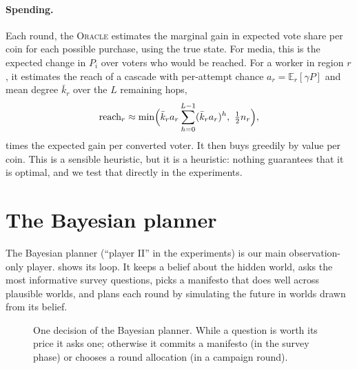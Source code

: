 \documentclass[11pt,a4paper,oneside]{report}
\newcommand{\E}{\mathbb{E}}
\newcommand{\ORACLE}{\textsc{Oracle}}
\begin{document}
\paragraph{Spending.} Each round, the \ORACLE{} estimates the marginal gain in expected vote share per coin
for each possible purchase, using the true state. For media, this is the expected change in $P_i$ over
voters who would be reached. For a worker in region $r$, it estimates the reach of a cascade with
per-attempt chance $a_r = \E_r[\gamma P]$ and mean degree $\bar k_r$ over the $L$ remaining hops,
\begin{equation}
  \text{reach}_r \approx \min\Bigl(\bar k_r a_r \sum_{h=0}^{L-1} (\bar k_r a_r)^h,\ \tfrac12 n_r\Bigr),
\end{equation}
times the expected gain per converted voter. It then buys greedily by value per coin. This is a sensible
heuristic, but it is a heuristic: nothing guarantees that it is optimal, and we test that directly in the
experiments.

\section{The Bayesian planner}

The Bayesian planner (``player II'' in the experiments) is our main observation-only player.
 shows its loop. It keeps a belief about the hidden world, asks the most informative
survey questions, picks a manifesto that does well across plausible worlds, and plans each round by
simulating the future in worlds drawn from its belief.

\begin{figure}[t]
\centering
{}
\caption{One decision of the Bayesian planner. While a question is worth its price it asks one; otherwise it
commits a manifesto (in the survey phase) or chooses a round allocation (in a campaign round).}
\label{fig:bayes}
\end{figure}
\end{document}
